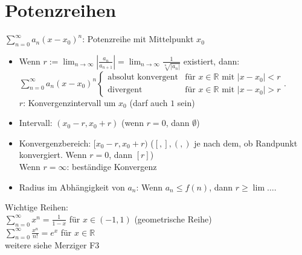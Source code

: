 \section{Potenzreihen}
$\sum_{n=0}^\infty a_n (x-x_0)^n$: Potenzreihe mit Mittelpunkt $x_0$
\begin{itemize}
\item Wenn $r:=\lim_{n\to \infty} \left| \frac{a_n}{a_{n+1}}\right|=\lim_{n\to \infty} \frac{1}{\sqrt[n]{|a_n|}}$ existiert, dann:\\
$\sum_{n=0}^\infty a_n (x-x_0)^n\begin{cases}
\text{absolut konvergent} & \text{für }x\in \mathbb{R} \text{ mit }|x-x_0|<r\\
\text{divergent} & \text{für }x\in \mathbb{R} \text{ mit }|x-x_0|>r
\end{cases}$.\\
$r$: Konvergenzintervall um $x_0$ (darf auch $1$ sein)
\item Intervall: $(x_0-r, x_0+r)$ (wenn $r=0$, dann $\emptyset$)
\item Konvergenzbereich: $[x_0-r,x_0+r)$ ($[,],(,)$ je nach dem, ob Randpunkt konvergiert. Wenn $r=0$, dann $[r]$)\\
Wenn $r=\infty$: beständige Konvergenz
\item Radius im Abhängigkeit von $a_n$: Wenn $a_n\leq f(n)$, dann $r\geq \lim \dots$.
\end{itemize}
Wichtige Reihen:\\
$\sum_{n=0}^\infty x^n = \frac{1}{1-x}$ für $x\in (-1,1)$ (geometrische Reihe)\\
$\sum_{n=0}^\infty \frac{x^n}{n!}=e^x$ für $x\in \mathbb{R}$\\
weitere siehe Merziger F3


